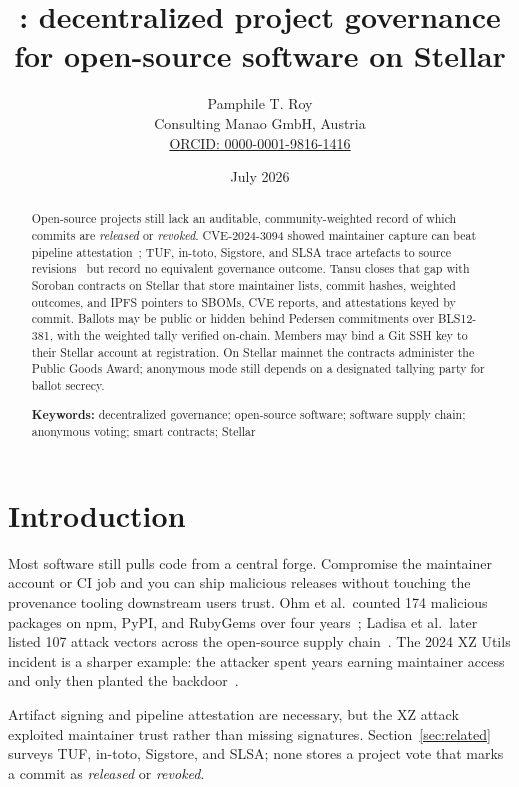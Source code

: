 \documentclass[11pt]{article}
\title{\tansu{}: decentralized project governance\\for open-source software on Stellar}
\author{%
  Pamphile T. Roy\\[2pt]
  \small Consulting Manao GmbH, Austria\\
  \small \href{https://orcid.org/0000-0001-9816-1416}{ORCID: 0000-0001-9816-1416}
}
\date{July 2026}
\newcommand{\tansu}{Tansu}
\begin{document}
\maketitle

\begin{abstract}
Open-source projects still lack an auditable, community-weighted record of
which commits are \emph{released} or \emph{revoked}.
CVE-2024-3094 showed maintainer capture can beat pipeline
attestation~\citep{cve2024xz,wolves2025xz}; TUF, in-toto, Sigstore, and SLSA
trace artefacts to source revisions~\citep{tuf,in_toto,newman2022sigstore,slsa}
but record no equivalent governance outcome.
\tansu{} closes that gap with Soroban contracts on Stellar
that store maintainer lists, commit hashes, weighted outcomes, and IPFS pointers
to SBOMs, CVE reports, and attestations keyed by commit. Ballots may be public
or hidden behind Pedersen commitments over BLS12-381, with the weighted tally
verified on-chain. Members may bind a Git SSH key to their Stellar account at
registration. On Stellar mainnet the contracts administer the Public Goods
Award; anonymous mode still depends on a designated tallying party for ballot
secrecy.

\medskip
\noindent\textbf{Keywords:} decentralized governance; open-source software;
software supply chain; anonymous voting; smart contracts; Stellar
\end{abstract}

\section{Introduction}
\label{sec:intro}

Most software still pulls code from a central forge. Compromise the
maintainer account or CI job and you can ship malicious releases without
touching the provenance tooling downstream users trust. Ohm et al.\ counted
174 malicious packages on npm, PyPI, and RubyGems over four
years~\citep{ohm2020backstabber}; Ladisa et al.\ later listed 107 attack
vectors across the open-source supply chain~\citep{ladisa2023taxonomy}. The
2024 XZ Utils incident is a sharper example: the attacker spent years earning
maintainer access and only then planted the
backdoor~\citep{cve2024xz,wolves2025xz}.

Artifact signing and pipeline attestation are necessary, but the XZ attack
exploited maintainer trust rather than missing signatures. Section~\ref{sec:related}
surveys TUF, in-toto, Sigstore, and SLSA; none stores a project vote that
marks a commit as \emph{released} or \emph{revoked}.
\end{document}
